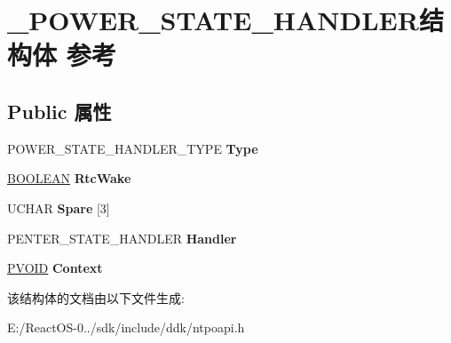 \hypertarget{struct___p_o_w_e_r___s_t_a_t_e___h_a_n_d_l_e_r}{}\section{\+\_\+\+P\+O\+W\+E\+R\+\_\+\+S\+T\+A\+T\+E\+\_\+\+H\+A\+N\+D\+L\+E\+R结构体 参考}
\label{struct___p_o_w_e_r___s_t_a_t_e___h_a_n_d_l_e_r}
\subsection*{Public 属性}
\begin{DoxyCompactItemize}
\item 
\mbox{\label{struct___p_o_w_e_r___s_t_a_t_e___h_a_n_d_l_e_r_a5ea3dd2d5e27b4780df2e658cde47572}} 
P\+O\+W\+E\+R\+\_\+\+S\+T\+A\+T\+E\+\_\+\+H\+A\+N\+D\+L\+E\+R\+\_\+\+T\+Y\+PE {\bfseries Type}
\item 
\mbox{\label{struct___p_o_w_e_r___s_t_a_t_e___h_a_n_d_l_e_r_a73967eac866d071665c7ef3092beed80}} 
\hyperlink{_processor_bind_8h_a112e3146cb38b6ee95e64d85842e380a}{B\+O\+O\+L\+E\+AN} {\bfseries Rtc\+Wake}
\item 
\mbox{\label{struct___p_o_w_e_r___s_t_a_t_e___h_a_n_d_l_e_r_a5f9025377457ebdf2fb6622e611ba711}} 
U\+C\+H\+AR {\bfseries Spare} \mbox{[}3\mbox{]}
\item 
\mbox{\label{struct___p_o_w_e_r___s_t_a_t_e___h_a_n_d_l_e_r_a62ace718ee5e4aae369ad62439a39c3f}} 
P\+E\+N\+T\+E\+R\+\_\+\+S\+T\+A\+T\+E\+\_\+\+H\+A\+N\+D\+L\+ER {\bfseries Handler}
\item 
\mbox{\label{struct___p_o_w_e_r___s_t_a_t_e___h_a_n_d_l_e_r_aa08037a7795dfe94c74160eeccfa7ce9}} 
\hyperlink{interfacevoid}{P\+V\+O\+ID} {\bfseries Context}
\end{DoxyCompactItemize}


该结构体的文档由以下文件生成\+:\begin{DoxyCompactItemize}
\item 
E\+:/\+React\+O\+S-\/0../sdk/include/ddk/ntpoapi.\+h\end{DoxyCompactItemize}
